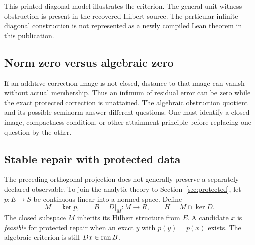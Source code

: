 This printed diagonal model illustrates the criterion. The general unit-witness obstruction is present in the recovered Hilbert source. The particular infinite diagonal construction is not represented as a newly compiled Lean theorem in this publication.


\subsection{Norm zero versus algebraic zero}
If an additive correction image is not closed, distance to that image can vanish without actual membership. Thus an infimum of residual error can be zero while the exact protected correction is unattained. The algebraic obstruction quotient and its possible seminorm answer different questions. One must identify a closed image, compactness condition, or other attainment principle before replacing one question by the other.

\subsection{Stable repair with protected data}
The preceding orthogonal projection does not generally preserve a separately declared observable. To join the analytic theory to Section~\ref{sec:protected}, let \(p:E\to S\) be continuous linear into a normed space. Define
\[
 M=\ker p,\qquad B=D|_M:M\to R,\qquad H=M\cap\ker D.
\]
The closed subspace \(M\) inherits its Hilbert structure from \(E\). A candidate \(x\) is \emph{feasible} for protected repair when an exact \(y\) with \(p(y)=p(x)\) exists. The algebraic criterion is still \(Dx\in\operatorname{ran} B\).

